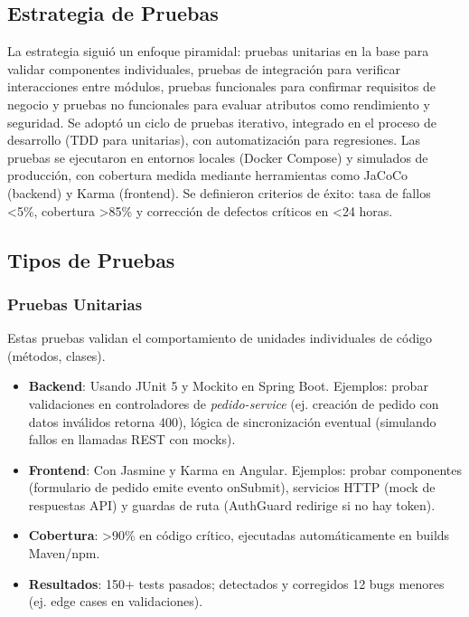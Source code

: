\documentclass[a4paper,12pt]{article}
\begin{document}
\subsection{Estrategia de Pruebas}
La estrategia siguió un enfoque piramidal: pruebas unitarias en la base para validar componentes individuales, pruebas de integración para verificar interacciones entre módulos, pruebas funcionales para confirmar requisitos de negocio y pruebas no funcionales para evaluar atributos como rendimiento y seguridad. Se adoptó un ciclo de pruebas iterativo, integrado en el proceso de desarrollo (TDD para unitarias), con automatización para regresiones. Las pruebas se ejecutaron en entornos locales (Docker Compose) y simulados de producción, con cobertura medida mediante herramientas como JaCoCo (backend) y Karma (frontend). Se definieron criterios de éxito: tasa de fallos <5\%, cobertura >85\% y corrección de defectos críticos en <24 horas.

\subsection{Tipos de Pruebas}

\subsubsection{Pruebas Unitarias}
Estas pruebas validan el comportamiento de unidades individuales de código (métodos, clases). 
\begin{itemize}
    \item \textbf{Backend}: Usando JUnit 5 y Mockito en Spring Boot. Ejemplos: probar validaciones en controladores de \textit{pedido-service} (ej. creación de pedido con datos inválidos retorna 400), lógica de sincronización eventual (simulando fallos en llamadas REST con mocks).
    \item \textbf{Frontend}: Con Jasmine y Karma en Angular. Ejemplos: probar componentes (formulario de pedido emite evento onSubmit), servicios HTTP (mock de respuestas API) y guardas de ruta (AuthGuard redirige si no hay token).
    \item \textbf{Cobertura}: >90\% en código crítico, ejecutadas automáticamente en builds Maven/npm.
    \item \textbf{Resultados}: 150+ tests pasados; detectados y corregidos 12 bugs menores (ej. edge cases en validaciones).
\end{itemize}
\end{document}
